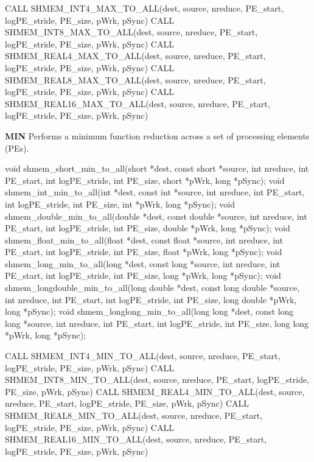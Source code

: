 \begin{apidefinition}
\begin{Fsynopsis}
CALL SHMEM_INT4_MAX_TO_ALL(dest, source, nreduce, PE_start, logPE_stride, PE_size, pWrk, pSync)
CALL SHMEM_INT8_MAX_TO_ALL(dest, source, nreduce, PE_start, logPE_stride, PE_size, pWrk, pSync)
CALL SHMEM_REAL4_MAX_TO_ALL(dest, source, nreduce, PE_start, logPE_stride, PE_size, pWrk, pSync)
CALL SHMEM_REAL8_MAX_TO_ALL(dest, source, nreduce, PE_start, logPE_stride, PE_size, pWrk, pSync)
CALL SHMEM_REAL16_MAX_TO_ALL(dest, source, nreduce, PE_start, logPE_stride, PE_size, pWrk, pSync)
\end{Fsynopsis}

\bigskip
\textbf{MIN} \newline
Performs a minimum function reduction across a set of processing elements (\acp{PE}).\newline
\begin{Csynopsis}
void shmem_short_min_to_all(short *dest, const short *source, int nreduce, int PE_start, int logPE_stride, int PE_size, short *pWrk, long *pSync);
void shmem_int_min_to_all(int *dest, const int *source, int nreduce, int PE_start, int logPE_stride, int PE_size, int *pWrk, long *pSync);
void shmem_double_min_to_all(double *dest, const double *source, int nreduce, int PE_start, int logPE_stride, int PE_size, double *pWrk, long *pSync);
void shmem_float_min_to_all(float *dest, const float *source, int nreduce, int PE_start, int logPE_stride, int PE_size, float *pWrk, long *pSync);
void shmem_long_min_to_all(long *dest, const long *source, int nreduce, int PE_start, int logPE_stride, int PE_size, long *pWrk, long *pSync);
void shmem_longdouble_min_to_all(long double *dest, const long double *source, int nreduce, int PE_start, int logPE_stride, int PE_size, long double *pWrk, long *pSync);
void shmem_longlong_min_to_all(long long *dest, const long long *source, int nreduce, int PE_start, int logPE_stride, int PE_size, long long *pWrk, long *pSync);
\end{Csynopsis}

\begin{Fsynopsis}
CALL SHMEM_INT4_MIN_TO_ALL(dest, source, nreduce, PE_start, logPE_stride, PE_size, pWrk, pSync)
CALL SHMEM_INT8_MIN_TO_ALL(dest, source, nreduce, PE_start, logPE_stride, PE_size, pWrk, pSync)
CALL SHMEM_REAL4_MIN_TO_ALL(dest, source, nreduce, PE_start, logPE_stride, PE_size, pWrk, pSync)
CALL SHMEM_REAL8_MIN_TO_ALL(dest, source, nreduce, PE_start, logPE_stride, PE_size, pWrk, pSync)
CALL SHMEM_REAL16_MIN_TO_ALL(dest, source, nreduce, PE_start, logPE_stride, PE_size, pWrk, pSync)
\end{Fsynopsis}


\end{apidefinition}
